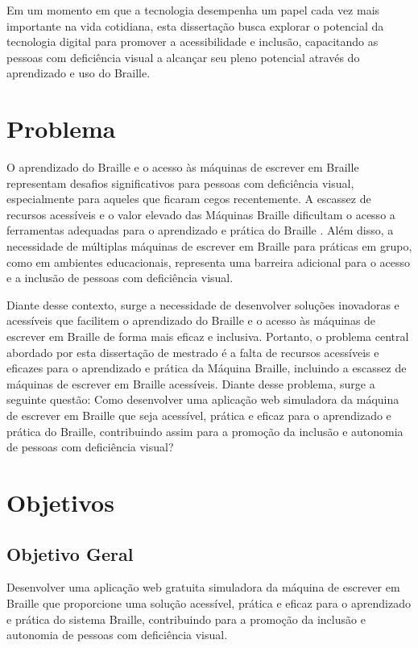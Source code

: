 Em um momento em que a tecnologia desempenha um papel cada vez mais importante na vida cotidiana, esta dissertação busca explorar o potencial da tecnologia digital para promover a acessibilidade e inclusão, capacitando as pessoas com deficiência visual a alcançar seu pleno potencial através do aprendizado e uso do Braille.

\section{Problema}

O aprendizado do Braille e o acesso às máquinas de escrever em Braille representam desafios significativos para pessoas com deficiência visual, especialmente para aqueles que ficaram cegos recentemente. A escassez de recursos acessíveis e o valor elevado das Máquinas Braille dificultam o acesso a ferramentas adequadas para o aprendizado e prática do Braille \parencite{REF01}. Além disso, a necessidade de múltiplas máquinas de escrever em Braille para práticas em grupo, como em ambientes educacionais, representa uma barreira adicional para o acesso e a inclusão de pessoas com deficiência visual.

Diante desse contexto, surge a necessidade de desenvolver soluções inovadoras e acessíveis que facilitem o aprendizado do Braille e o acesso às máquinas de escrever em Braille de forma mais eficaz e inclusiva. Portanto, o problema central abordado por esta dissertação de mestrado é a falta de recursos acessíveis e eficazes para o aprendizado e prática da Máquina Braille, incluindo a escassez de máquinas de escrever em Braille acessíveis. Diante desse problema, surge a seguinte questão: Como desenvolver uma aplicação web simuladora da máquina de escrever em Braille que seja acessível, prática e eficaz para o aprendizado e prática do Braille, contribuindo assim para a promoção da inclusão e autonomia de pessoas com deficiência visual?


\section{Objetivos}

\subsection{Objetivo Geral}

Desenvolver uma aplicação web gratuita simuladora da máquina de escrever em Braille que proporcione uma solução acessível, prática e eficaz para o aprendizado e prática do sistema Braille, contribuindo para a promoção da inclusão e autonomia de pessoas com deficiência visual.

